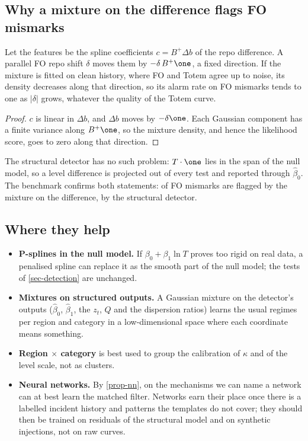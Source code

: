 \subsection{Why a mixture on the difference flags FO mismarks}
\begin{proposition}\label{prop-gmm-fo}
Let the features be the spline coefficients $c=B^+\Delta b$ of the repo difference. A parallel FO repo shift $\delta$
moves them by $-\delta\,B^+\one$, a fixed direction. If the mixture is fitted on clean history, where FO and Totem agree
up to noise, its density decreases along that direction, so its alarm rate on FO mismarks tends to one as $|\delta|$
grows, whatever the quality of the Totem curve.
\end{proposition}
\begin{proof}
$c$ is linear in $\Delta b$, and $\Delta b$ moves by $-\delta\one$. Each Gaussian component has a finite variance along
$B^+\one$, so the mixture density, and hence the likelihood score, goes to zero along that direction.
\end{proof}
The structural detector has no such problem: $T\cdot\one$ lies in the span of the null model, so a level difference is
projected out of every test and reported through $\hat\beta_0$. The benchmark confirms both statements: \vFoGmmDiff{} of
FO mismarks are flagged by the mixture on the difference, \vFoStruct{} by the structural detector.

\subsection{Where they help}
\begin{itemize}
\item \textbf{P-splines in the null model.} If $\beta_0+\beta_1\ln T$ proves too rigid on real data, a penalised spline
\cite{eilers1996} can replace it as the smooth part of the null model; the tests of \cref{sec-detection} are unchanged.
\item \textbf{Mixtures on structured outputs.} A Gaussian mixture on the detector's outputs ($\hat\beta_0$, $\hat\beta_1$, the
$z_t$, $Q$ and the dispersion ratios) learns the usual regimes per region and category in a low-dimensional space where each coordinate means something.
\item \textbf{Region $\times$ category} is best used to group the calibration of $\kappa$ and of the level scale, not as
clusters.
\item \textbf{Neural networks.} By \cref{prop-nn}, on the mechanisms we can name a network can at best learn the
matched filter. Networks earn their place once there is a labelled incident history and patterns the templates do not
cover; they should then be trained on residuals of the structural model and on synthetic injections, not on raw
curves.
\end{itemize}
